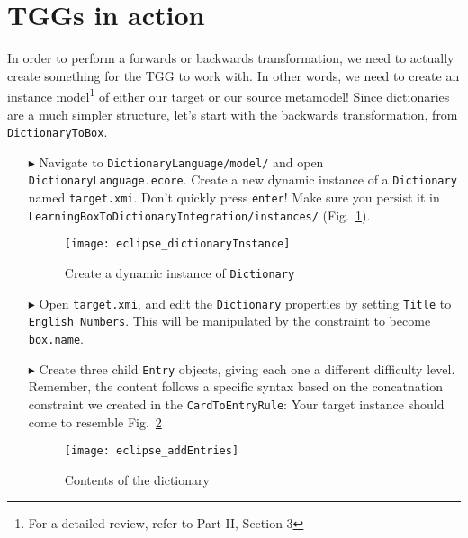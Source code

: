 \newpage
\section{TGGs in action}
\genHeader
\label{sect:TGGs_in_Action}

In order to perform a forwards or backwards transformation, we need to actually create something for the TGG to work with. In other words, we need to create an
instance model\footnote{For a detailed review, refer to Part II, Section 3} of either our target or our source metamodel! Since dictionaries are a much simpler
structure, let's start with the backwards transformation, from \texttt{DictionaryToBox}.

\begin{itemize}

\item[$\blacktriangleright$] Navigate to \texttt{Dictionary\-Language/model/} and open \texttt{Dictio\-nary\-Lang\-uage.ecore}. Create a new
dynamic instance of a \texttt{Dictionary} named \texttt{target.xmi}. Don't quickly press \texttt{enter}! Make sure you persist it in
\texttt{Learn\-ing\-Box\-To\-Dictionary\-In\-te\-gra\-tion/in\-stan\-ces/} (Fig.~\ref{fig:create_instance_dict}).

\begin{figure}[htbp]
\begin{center}
  \texttt{[image: eclipse\_dictionaryInstance]}
  \caption{Create a dynamic instance of \texttt{Dictionary}}
  \label{fig:create_instance_dict}
\end{center}
\end{figure}

\newpage

\item[$\blacktriangleright$] Open \texttt{target.xmi}, and edit the \texttt{Dictionary} properties by setting \texttt{Title} to \texttt{English Numbers}. This
will be manipulated by the constraint to become \texttt{box.name}.

\item[$\blacktriangleright$] Create three child \texttt{Entry} objects, giving each one a different difficulty level. Remember, the content follows a specific
syntax based on the concatnation constraint we created in the \texttt{CardToEntryRule}:
Your target instance should come to resemble Fig.~\ref{fig:dictionaryxmi}

\begin{figure}[htbp]
\begin{center}
  \texttt{[image: eclipse\_addEntries]}
  \caption{Contents of the dictionary}
  \label{fig:dictionaryxmi}
\end{center}
\end{figure}


\end{itemize}
